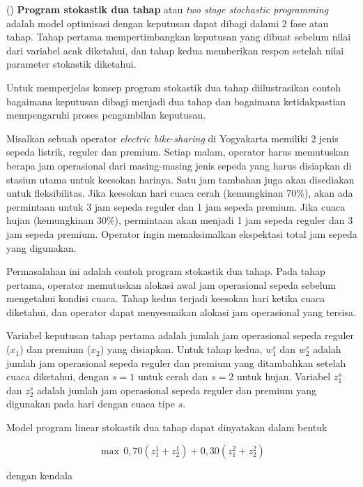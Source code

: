 \begin{definisi}()
    \textbf{Program stokastik dua tahap} atau \textit{two stage stochastic programming} adalah model optimisasi dengan keputusan dapat dibagi dalami 2 fase atau tahap. Tahap pertama mempertimbangkan keputusan yang dibuat sebelum nilai dari variabel acak diketahui, dan tahap kedua memberikan respon setelah nilai parameter stokastik diketahui.
\end{definisi}

Untuk memperjelas konsep program stokastik dua tahap diilustrasikan contoh bagaimana keputusan dibagi menjadi dua tahap dan bagaimana ketidakpastian mempengaruhi proses pengambilan keputusan.

\begin{contoh}
    Misalkan sebuah operator \textit{electric bike-sharing} di Yogyakarta memiliki 2 jenis sepeda listrik, reguler dan premium. Setiap malam, operator harus memutuskan berapa jam operasional dari masing-masing jenis sepeda yang harus disiapkan di stasiun utama untuk keesokan harinya. Satu jam tambahan juga akan disediakan untuk fleksibilitas. Jika keesokan hari cuaca cerah (kemungkinan 70\%), akan ada permintaan untuk 3 jam sepeda reguler dan 1 jam sepeda premium. Jika cuaca hujan (kemungkinan 30\%), permintaan akan menjadi 1 jam sepeda reguler dan 3 jam sepeda premium. Operator ingin memaksimalkan ekspektasi total jam sepeda yang digunakan.

    Permasalahan ini adalah contoh program stokastik dua tahap. Pada tahap pertama, operator memutuskan alokasi awal jam operasional sepeda sebelum mengetahui kondisi cuaca. Tahap kedua terjadi keesokan hari ketika cuaca diketahui, dan operator dapat menyesuaikan alokasi jam operasional yang tersisa.

    Variabel keputusan tahap pertama adalah jumlah jam operasional sepeda reguler ($x_1$) dan premium ($x_2$) yang disiapkan. Untuk tahap kedua, $w_1^s$ dan $w_2^s$ adalah jumlah jam operasional sepeda reguler dan premium yang ditambahkan setelah cuaca diketahui, dengan $s = 1$ untuk cerah dan $s = 2$ untuk hujan. Variabel $z_1^s$ dan $z_2^s$ adalah jumlah jam operasional sepeda reguler dan premium yang digunakan pada hari dengan cuaca tipe $s$.
    
    Model program linear stokastik dua tahap dapat dinyatakan dalam bentuk
    
    $$
    \max \, 0{,}70 (z_1^1 + z_2^1) + 0{,}30 (z_1^2 + z_2^2)
    $$
    
    dengan kendala
    

\end{contoh}
